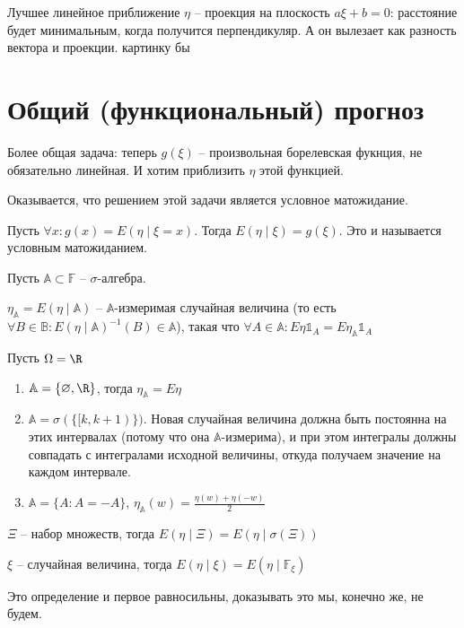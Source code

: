 Лучшее линейное приближение $\eta$ -- проекция на плоскость $a\xi + b = 0$: расстояние будет минимальным, когда получится перпендикуляр.
А он вылезает как разность вектора и проекции.  \TODO картинку бы \TODO


\section{Общий (функциональный) прогноз}

Более общая задача: теперь $g(\xi)$ -- произвольная борелевская фукнция, не обязательно линейная.
И хотим приблизить $\eta$ этой функцией.    

Оказывается, что решением этой задачи является условное матожидание.

\begin{Def}
Пусть $\forall x\colon g(x) = E(\eta \mid \xi = x)$. Тогда $E(\eta \mid \xi) = g(\xi)$. Это и называется условным матожиданием.
\end{Def}

\begin{Def}
    Пусть $\mathbb{A} \subset \mathbb{F}$ -- $\sigma$-алгебра.

    $\eta_\mathbb{A} = E(\eta \mid \mathbb{A})$ -- $\mathbb{A}$-измеримая случайная величина (то есть $\forall B \in \mathbb{B}\colon E(\eta \mid \mathbb{A})^{-1}(B) \in \mathbb{A}$),
    такая что $\forall A \in \mathbb{A}\colon E\eta \mathbb{1}_A = E\eta_\mathbb{A} \mathbb{1}_A$
\end{Def}
\begin{exmp}
    Пусть $\Omega = \R$
    \begin{enumerate}
    \item
        $\mathbb{A} = \{\varnothing, \R\}$, тогда $\eta_\mathbb{A} = E\eta$
    \item
        $\mathbb{A} = \sigma(\{[k, k + 1)\})$. Новая случайная величина должна быть постоянна на этих интервалах (потому что она $\mathbb{A}$-измерима), 
        и при этом интегралы должны совпадать с интегралами исходной величины, откуда получаем значение на каждом интервале.
    \item   
        $\mathbb{A} = \{A \colon A = -A\}$, $\eta_\mathbb{A}(w) = \frac{\eta(w) + \eta(-w)}{2}$
    \end{enumerate}
\end{exmp}

\begin{Def}
    $\Xi$ -- набор множеств, тогда $E(\eta \mid \Xi) = E(\eta \mid \sigma(\Xi))$

    $\xi$ -- случайная величина, тогда $E(\eta \mid \xi) = E(\eta \mid \mathbb{F}_\xi)$
\end{Def}
\begin{Rem}
    Это определение и первое равносильны, доказывать это мы, конечно же, не будем.
\end{Rem}
